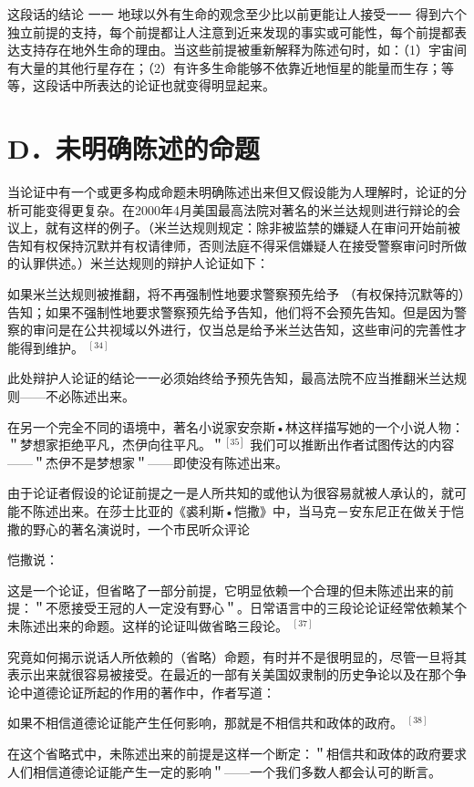 这段话的结论 一一 地球以外有生命的观念至少比以前更能让人接受一一 得到六个独立前提的支持，每个前提都让人注意到近来发现的事实或可能性，每个前提都表达支持存在地外生命的理由。当这些前提被重新解释为陈述句时，如：（1）宇宙间有大量的其他行星存在；（2）有许多生命能够不依靠近地恒星的能量而生存；等等，这段话中所表达的论证也就变得明显起来。

\section*{D．未明确陈述的命题}
当论证中有一个或更多构成命题未明确陈述出来但又假设能为人理解时，论证的分析可能变得更复杂。在2000年4月美国最高法院对著名的米兰达规则进行辩论的会议上，就有这样的例子。（米兰达规则规定：除非被监禁的嫌疑人在审问开始前被告知有权保持沉默并有权请律师，否则法庭不得采信嫌疑人在接受警察审问时所做的认罪供述。）米兰达规则的辩护人论证如下：

如果米兰达规则被推翻，将不再强制性地要求警察预先给予 （有权保持沉默等的）告知；如果不强制性地要求警察预先给予告知，他们将不会预先告知。但是因为警察的审问是在公共视域以外进行，仅当总是给予米兰达告知，这些审问的完善性才能得到维护。 ${ }^{[34]}$

此处辩护人论证的结论一一必须始终给予预先告知，最高法院不应当推翻米兰达规则——不必陈述出来。

在另一个完全不同的语境中，著名小说家安奈斯•林这样描写她的一个小说人物：＂梦想家拒绝平凡，杰伊向往平凡。＂${ }^{[35]}$ 我们可以推断出作者试图传达的内容——＂杰伊不是梦想家＂——即使没有陈述出来。

由于论证者假设的论证前提之一是人所共知的或他认为很容易就被人承认的，就可能不陈述出来。在莎士比亚的《裘利斯•恺撒》中，当马克－安东尼正在做关于恺撒的野心的著名演说时，一个市民听众评论

恺撒说：

这是一个论证，但省略了一部分前提，它明显依赖一个合理的但未陈述出来的前提：＂不愿接受王冠的人一定没有野心＂。日常语言中的三段论论证经常依赖某个未陈述出来的命题。这样的论证叫做省略三段论。 ${ }^{[37]}$

究竟如何揭示说话人所依赖的（省略）命题，有时并不是很明显的，尽管一旦将其表示出来就很容易被接受。在最近的一部有关美国奴隶制的历史争论以及在那个争论中道德论证所起的作用的著作中，作者写道：

\begin{displayquote}
如果不相信道德论证能产生任何影响，那就是不相信共和政体的政府。 ${ }^{[38]}$
\end{displayquote}

在这个省略式中，未陈述出来的前提是这样一个断定：＂相信共和政体的政府要求人们相信道德论证能产生一定的影响＂——一个我们多数人都会认可的断言。

